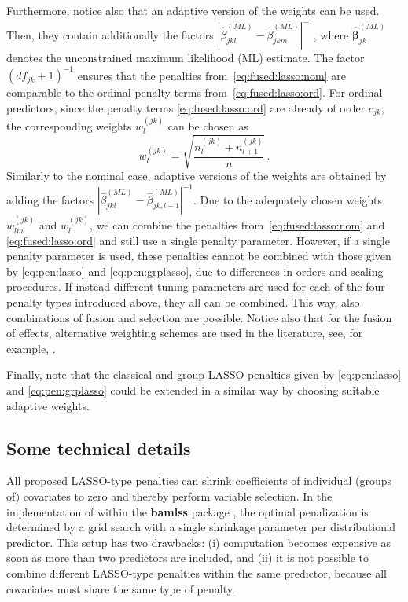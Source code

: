 \documentclass[submit]{smj}
\begin{document}
Furthermore, notice also that an adaptive version of the weights can be used. Then, they contain additionally the factors
$| \hat\beta_{jkl}^{(ML)}- \hat\beta_{jkm}^{(ML)}|^{-1}$, where $\hat{\boldsymbol{\beta}}_{jk}^{(ML)}$ denotes the unconstrained
maximum likelihood (ML) estimate.
The factor $(df_{jk}+1)^{-1}$ ensures that the penalties from~\eqref{eq:fused:lasso:nom} are comparable to the ordinal penalty terms from~\eqref{eq:fused:lasso:ord}. 
For ordinal predictors, since the penalty terms \eqref{eq:fused:lasso:ord} are already of order $c_{jk}$, the corresponding weights
$w_l^{(jk)}$ can be chosen as
$$
w_{l}^{(jk)} = \sqrt{\frac{n_l^{(jk)}+n_{l+1}^{(jk)}}{n}} \,.
$$
Similarly to the nominal case, adaptive versions of the weights are obtained
by adding the factors $| \hat\beta_{jkl}^{(ML)}- \hat\beta_{jk,l-1}^{(ML)}|^{-1}$.
Due to the adequately chosen weights $w_{lm}^{(jk)}$ and $w_l^{(jk)}$, we can combine the penalties from~\eqref{eq:fused:lasso:nom} and \eqref{eq:fused:lasso:ord} and still use a single penalty parameter. However,
if a single penalty parameter is used, these penalties cannot be combined with those
 given by \eqref{eq:pen:lasso} and \eqref{eq:pen:grplasso}, due to differences in orders and scaling procedures. If instead different tuning parameters are used for each of the four penalty types introduced above, they all can be combined. This way, also combinations of fusion and selection are possible.
Notice also that for the fusion of effects, alternative weighting schemes are used in the literature, see, for example, \citet{ChiEtAl:2017}.

Finally, note that the classical and group LASSO penalties given by \eqref{eq:pen:lasso} and \eqref{eq:pen:grplasso} could be extended in a similar way by choosing suitable adaptive weights.

\subsection*{Some technical details}

\noindent All proposed LASSO-type penalties can shrink coefficients of individual
(groups of) covariates to zero and thereby perform variable selection. In the implementation 
of \citet{GroHaKneUm:2019} within the \textbf{bamlss} package \citep{bamlss:jss}, the 
optimal penalization is determined by a grid search with a single shrinkage parameter per 
distributional predictor. This setup has two drawbacks: (i) computation becomes expensive as 
soon as more than two predictors are included, and (ii) it is not possible to combine 
different LASSO-type penalties within the same predictor, because all covariates must share 
the same type of penalty.
\end{document}
